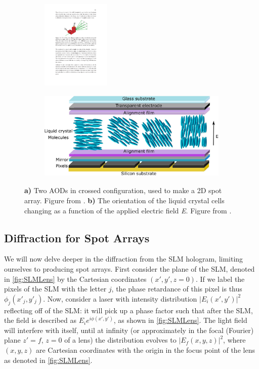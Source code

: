 \begin{figure}
	\begin{subfigure}{.39\textwidth}
		\includegraphics[height=4.25cm]{figures/crossAOD.pdf}
		\caption{}
		\label{fig:CrossAOD}
	\end{subfigure}
	\hfill
	\begin{subfigure}{.59\textwidth}
		\includegraphics[height=4.25cm]{figures/LCoS.png}
		\caption{}
		\label{fig:LCoS}
	\end{subfigure}
	\caption{\textsf{\textbf{a)}} Two \ac{AOD}s in crossed configuration, used to make a 2D spot array. Figure from \cite{Cooper2018}. 
	\textsf{\textbf{b)}} The orientation of the liquid crystal cells changing as a function of the applied electric field \textit{E}. 
	Figure from \cite{Guzman2017}.}
\end{figure}


\subsection{Diffraction for Spot Arrays}\label{sec:PropagationDerivation}

We will now delve deeper in the diffraction from the SLM hologram, limiting ourselves to producing spot arrays.
First consider the plane of the SLM, denoted in \cref{fig:SLMLens} by the Cartesian coordinates $(x',y',z=0)$. 
If we label the pixels of the SLM with the letter $j$, the phase retardance of this pixel is thus $\phi_j(x'_j,y'_j)$.
Now, consider a laser with intensity distribution $|E_i(x',y')|^2$ reflecting off of the SLM: it will pick up a phase factor such that after the SLM, the field is described as $E_i e^{i\phi(x',y')}$, as shown in \cref{fig:SLMLens}. 
The light field will interfere with itself, until at infinity (or approximately in the focal (Fourier) plane $z'=f$, $z=0$ of a lens) the distribution evolves to $|E_f(x,y,z)|^2$, where $(x,y,z)$ are Cartesian coordinates with the origin in the focus point of the lens as denoted in \cref{fig:SLMLens}.

